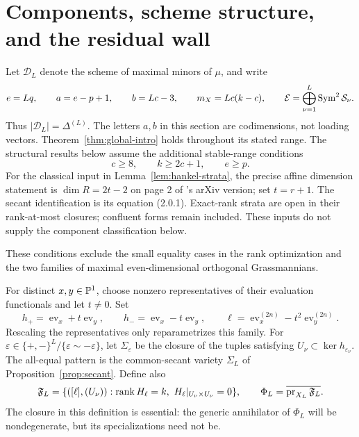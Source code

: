 \section{Components, scheme structure, and the residual wall}\label{sec:components}
Let $\mathscr D_L$ denote the scheme of maximal minors of $\mu$, and write
\[
 e=Lq,\qquad a=e-p+1,\qquad b=Lc-3,\qquad
 m_X=Lc(k-c),\qquad \mathcal E=\bigoplus_{\nu=1}^L\operatorname{Sym}^2\mathcal S_\nu.
\]
Thus $|\mathscr D_L|=\Delta^{(L)}$. The letters $a,b$ in this section are codimensions, not loading vectors. Theorem~\ref{thm:global-intro} holds throughout its stated range. The structural results below assume the additional stable-range conditions
\begin{equation}\label{eq:stable-range}
 c\ge8,\qquad k\ge2c+1,\qquad e\ge p.
\end{equation}
For the classical input in Lemma~\ref{lem:hankel-strata}, the precise affine dimension statement is $\dim R=2t-2$ on page 2 of \cite{CMSV}'s arXiv version; set $t=r+1$. The secant identification is its equation (2.0.1). Exact-rank strata are open in their rank-at-most closures; confluent forms remain included. These inputs do not supply the component classification below.

These conditions exclude the small equality cases in the rank optimization and the two families of maximal even-dimensional orthogonal Grassmannians.

For distinct $x,y\in\mathbb P^1$, choose nonzero representatives of their evaluation functionals and let $t\ne0$. Set
\begin{equation}\label{eq:signed-hyperplanes}
 h_+=\operatorname{ev}_x+t\operatorname{ev}_y,\qquad
 h_-=\operatorname{ev}_x-t\operatorname{ev}_y,\qquad
 \ell=\operatorname{ev}_x^{(2n)}-t^2\operatorname{ev}_y^{(2n)}.
\end{equation}
Rescaling the representatives only reparametrizes this family. For
$\varepsilon\in\{+,-\}^L/\{\varepsilon\sim-\varepsilon\}$, let
$\Sigma_\varepsilon$ be the closure of the tuples satisfying
$U_\nu\subset\ker h_{\varepsilon_\nu}$. The all-equal pattern is the common-secant variety $\Sigma_L$ of Proposition~\ref{prop:secant}. Define also
\begin{equation}\label{eq:full-incidence}
 \mathfrak F_L=\{([\ell],(U_\nu)):\operatorname{rank} H_\ell=k,\
                                      H_\ell|_{U_\nu\times U_\nu}=0\},
 \qquad \Phi_L=\overline{\operatorname{pr}_{X_L}\mathfrak F_L}.
\end{equation}
The closure in this definition is essential: the generic annihilator of $\Phi_L$ will be nondegenerate, but its specializations need not be.

